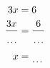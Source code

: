 \documentclass[varwidth]{standalone}
\begin{document}
    \begin{varwidth}{0.25\paperwidth}
    \begin{align*}
    3x &= 6\\
    \frac{3x}{\dotuline{\hspace{4mm}}} &= \frac{6}{\dotuline{\hspace{4mm}}}\\
    x &= \dotuline{\hspace{4mm}}\\
\end{align*}
\end{varwidth}
\end{document}
